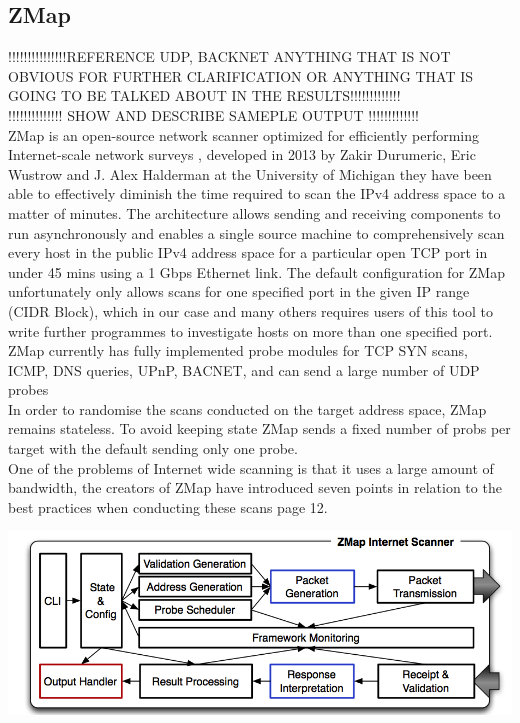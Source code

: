 \documentclass[a4wide,leqno,12pt]{report}
\begin{document}
\subsection{ZMap}
!!!!!!!!!!!!!!!REFERENCE UDP, BACKNET ANYTHING THAT IS NOT OBVIOUS FOR FURTHER CLARIFICATION OR ANYTHING THAT IS GOING TO BE TALKED ABOUT IN THE RESULTS!!!!!!!!!!!!!\\


!!!!!!!!!!!!!! SHOW AND DESCRIBE SAMEPLE OUTPUT !!!!!!!!!!!!!\\




ZMap is an open-source network scanner optimized for efficiently performing
Internet-scale network surveys \cite{durumeric2013zmap}, developed in 2013 by Zakir Durumeric, Eric Wustrow and J. Alex Halderman at the University of Michigan they have been able to effectively diminish the time required to scan the IPv4 address space to a matter of minutes. The architecture allows sending and receiving components
to run asynchronously and enables a single source machine to comprehensively scan every host in the public IPv4
address space for a particular open TCP port in under 45 mins using a 1 Gbps Ethernet link\cite{durumeric2013zmap}. The default configuration for ZMap unfortunately only allows scans for one specified port in the given IP range (CIDR Block), which in our case and many others requires users of this tool to write further programmes to investigate hosts on more than one specified port. ZMap currently has fully implemented probe modules for TCP SYN scans, ICMP, DNS queries, UPnP, BACNET, and can send a large number of UDP probes \cite{zmapGithub}\\


In order to randomise the scans conducted on the target address space, ZMap remains stateless. To avoid keeping state ZMap sends a fixed number of probs per target with the default sending only one probe.\cite{durumeric2013zmap}\\

One of the problems of Internet wide scanning is that it uses a large amount of bandwidth,
the creators of ZMap have introduced seven points in relation to the best practices when conducting these scans\cite{durumeric2013zmap} page 12. \\


\begin{center}
\includegraphics[scale=.4]{images/zmap_architecture.png}
\end{center}
\end{document}
